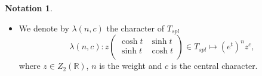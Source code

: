 \documentclass[11pt, a4paper]{amsart}
\theoremstyle{plain}
\theoremstyle{definition}
\newtheorem{notation}[theorem]{Notation}
\numberwithin{equation}{section}
\def\RR{\mathbb{R}}
\DeclareMathOperator{\GL}{\mathrm{GL}}
\begin{document}
\begin{notation}
\begin{itemize}
                  for $\begin{pmatrix}
                        \cosh t & \sinh t \\
                        \sinh t & \cosh t \\ 
                      \end{pmatrix} \in \GL_2(\RR)$, then we have 
                \begin{equation*}
                    C \begin{pmatrix}
                        \cosh t & \sinh t \\
                        \sinh t & \cosh t \\ 
                      \end{pmatrix} C^{-1} = \begin{pmatrix}
                                                e^{t} & \\ 
                                                      & e^{-t} \\
                                             \end{pmatrix}. 
                \end{equation*}
        \item We denote by $\lambda(n, c)$ the character of $T_{spl}$ 
                \begin{equation*}
                    \lambda(n, c) \colon z \begin{pmatrix}
                                        \cosh t & \sinh t \\
                                        \sinh t & \cosh t \\
                                     \end{pmatrix} \in T_{spl} \longmapsto (e^t)^{n} z^{c},
                \end{equation*}
            where $z \in Z_{2}(\RR)$, $n$ is the weight and $c$ is the central character. 
    \end{itemize}
    
\end{notation}
\end{document}
